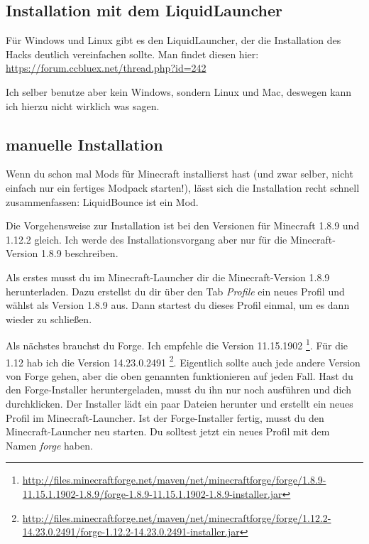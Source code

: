 \subsection{Installation mit dem LiquidLauncher}

Für Windows und Linux gibt es den LiquidLauncher, der die Installation des Hacks deutlich vereinfachen sollte. Man findet diesen hier: \url{https://forum.ccbluex.net/thread.php?id=242}

Ich selber benutze aber kein Windows, sondern Linux und Mac, deswegen kann ich hierzu nicht wirklich was sagen.

\subsection{manuelle Installation}

\begin{hinweis}
    Wenn du schon mal Mods für Minecraft installierst hast (und zwar selber, nicht einfach nur ein fertiges Modpack starten!), lässt sich die Installation recht schnell zusammenfassen: LiquidBounce ist ein Mod.
\end{hinweis}

Die Vorgehensweise zur Installation ist bei den Versionen für Minecraft 1.8.9 und 1.12.2 gleich. Ich werde des Installationsvorgang aber nur für die Minecraft-Version 1.8.9 beschreiben.

Als erstes musst du im Minecraft-Launcher dir die Minecraft-Version 1.8.9 herunterladen. Dazu erstellst du dir über den Tab \textit{Profile} ein neues Profil und wählst als Version 1.8.9 aus. Dann startest du dieses Profil einmal, um es dann wieder zu schließen.

Als nächstes brauchst du Forge. Ich empfehle die Version 11.15.1902 \footnote{\url{http://files.minecraftforge.net/maven/net/minecraftforge/forge/1.8.9-11.15.1.1902-1.8.9/forge-1.8.9-11.15.1.1902-1.8.9-installer.jar}}. Für die 1.12 hab ich die Version 14.23.0.2491 \footnote{\url{http://files.minecraftforge.net/maven/net/minecraftforge/forge/1.12.2-14.23.0.2491/forge-1.12.2-14.23.0.2491-installer.jar}}. Eigentlich sollte auch jede andere Version von Forge gehen, aber die oben genannten funktionieren auf jeden Fall. Hast du den Forge-Installer heruntergeladen, musst du ihn nur noch ausführen und dich durchklicken. Der Installer lädt ein paar Dateien herunter und erstellt ein neues Profil im Minecraft-Launcher. Ist der Forge-Installer fertig, musst du den Minecraft-Launcher neu starten. Du solltest jetzt ein neues Profil mit dem Namen \textit{forge} haben.

